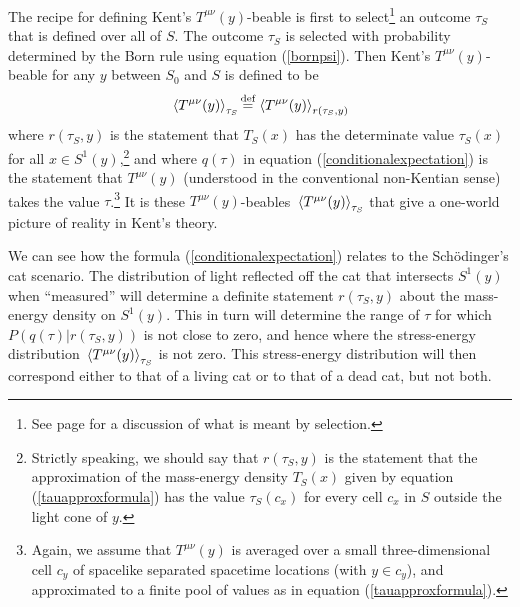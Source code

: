 The recipe for defining Kent's $T^{\mu\nu}(y)$-beable is first to select\footnote{See page \pageref{selectionmeaning} for a discussion of what is meant by selection.} an outcome $\tau_S$ that is defined over all of $S$. The outcome $\tau_S$ is selected with probability determined by the Born rule using equation (\ref{bornpsi}). Then Kent's $T^{\mu\nu}(y)$-beable for any $y$ between $S_0$ and $S$ is defined to be
\begin{equation}\label{Kentbeable} 
  \ev*{T^{\mu\nu}(y)}_{\tau_S}\myeq \ev*{T^{\mu\nu}(y)}_{r(\tau_S,y)}
\end{equation} %
%
where $r(\tau_S, y)$ is %
%
 the statement that $T_S(x)$ has the determinate value $\tau_S(x)$ for all $x\in S^1(y)$,\footnote{Strictly speaking, we should say that $r(\tau_S, y)$ is the statement that the approximation of the mass-energy density $T_S(x)$ given by equation (\ref{tauapproxformula}) has the value $\tau_S(c_x)$ for every cell $c_x$ in $S$ outside the light cone of $y$.} and where $q(\tau)$ in equation (\ref{conditionalexpectation}) is %
  the statement that $T^{\mu\nu}(y)$ (understood in the conventional non-Kentian sense) takes the value $\tau$.\footnote{\label{cyfootnote}Again, we assume that $T^{\mu\nu}(y)$ is averaged over a small three-dimensional cell $c_y$ of spacelike separated spacetime locations (with $y\in c_y$), and approximated to a finite pool of values as in equation  (\ref{tauapproxformula}).} It is these $T^{\mu\nu}(y)$-beables $\ev*{T^{\mu\nu}(y)}_{\tau_S}$ that give a one-world picture of reality in Kent's theory. 

We can see how the formula (\ref{conditionalexpectation}) relates to the Sch\"{o}dinger's cat scenario. The distribution of light reflected off the cat that intersects $S^1(y)$ when ``measured'' will determine a definite statement $r(\tau_S, y)$ about the mass-energy density on $S^1(y)$. This in turn will determine the range of $\tau$ for which $P(q(\tau)|r(\tau_S,y))$ is not close to zero, and hence where the stress-energy distribution $\ev*{T^{\mu\nu}(y)}_{\tau_S}$ is not zero. This stress-energy distribution will then correspond either to that of  a living cat or to that of a dead cat, but not both.  

